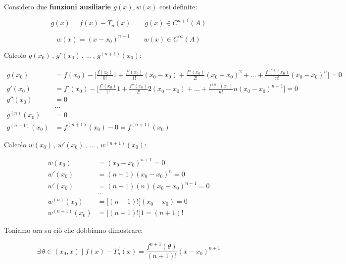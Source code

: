 \documentclass[../dimostrazioni]{subfiles}
\begin{document}
            \medskip

            Considero due \textbf{funzioni ausiliarie \(g(x), w(x)\)} così definite:

            \[  g(x) = f(x) - T_n (x) \qquad g(x) \in C^{n+1} (A)  \]

            \[  w(x) = (x - x_0)^{n+1} \qquad w(x) \in C^{\infty} (A)  \]

            \newpage

            Calcolo \( g(x_0)\, , \, g'(x_0)\, ,\, \dots\, , \, g ^{(n+1)}(x_0)  \):
            
            \begin{align*}
                g(x_0) &= f(x_0) - \bigg[\frac{f(x_0)}{0!}1 + \frac{f'(x_0)}{1!}(x_0-x_0) + \frac{f''(x_0)}{2!}(x_0-x_0)^2 + \dots + \frac{f^{(n)}(x_0)}{n!}(x_0-x_0)^n \bigg] = 0\\
                g'(x_0) &= f'(x_0) - \bigg[\frac{f'(x_0)}{1!}1 + \frac{f''(x_0)}{2!}2(x_0-x_0) + \dots + \frac{f^{(n)}(x_0)}{n!}n(x_0-x_0)^{n-1} \bigg] = 0\\
                g''(x_0) &= 0\\
                &\dots\\
                g^{(n)} (x_0) &= 0\\
                g^{(n+1)} (x_0) &= f^{(n+1)}(x_0) - 0 = f^{(n+1)}(x_0)
            \end{align*}

            \bigskip
            
            Calcolo \( w(x_0)\, , \, w'(x_0)\, ,\, \dots\, , \, w ^{(n+1)}(x_0)  \):

            \begin{align*}
                w(x_0) &= (x_0 - x_0)^{n+1} = 0\\
                w'(x_0) &= (n+1)(x_0 - x_0)^{n} = 0\\
                w'(x_0) &= (n+1)(n)(x_0 - x_0)^{n-1} = 0\\
                & \dots\\
                w^{(n)} (x_0) &= \big[(n+1)!\big](x_0 - x_0) = 0\\
                w^{(n+1)} (x_0) &= \big[(n+1)!\big] 1 = (n+1)!
            \end{align*}

            \bigskip

            Toniamo ora su ciò che dobbiamo dimostrare:

            \[  \exists \, \theta \in (x_0, x) \; | \; f(x) - T _n ^ f (x) = \frac{f^{n+1}(\theta)}{(n+1)!}(x-x_0)^{n+1} \]
\end{document}
